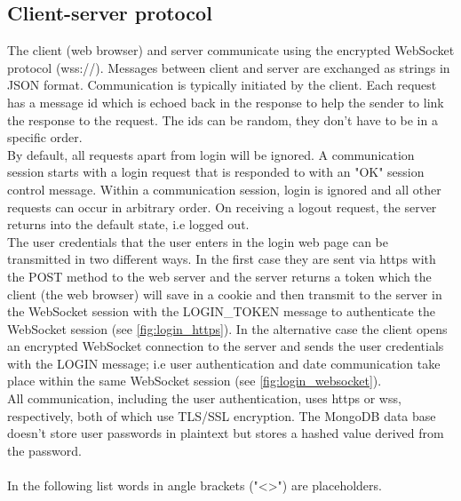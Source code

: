 \documentclass[oneside, english, final]{design}
\begin{document}
\clearpage


\subsection{Client-server protocol}
The client (web browser) and server communicate using the encrypted WebSocket protocol (wss://).
Messages between client and server are exchanged as strings in JSON format.
Communication is typically initiated by the client. Each request has a message id which is echoed back in the response to help the sender to link the response to the request. The ids can be random, they don't have to be in a specific order.
\\
By default, all requests apart from login will be ignored.  A communication session starts with a login request that is responded to with an "OK" session control message. Within a communication session, login is ignored and all other requests can occur in arbitrary order. On receiving a logout request, the server returns into the default state, i.e logged out.\\
The user credentials that the user enters in the login web page can be transmitted in two different ways.
In the first case they are sent via https with the POST method to the web server and the server returns a token which the client (the web browser) will save in a cookie and then transmit to the server in the WebSocket session with the LOGIN\_TOKEN message to authenticate the WebSocket session (see \autoref{fig:login_https}).
In the alternative case the client opens an encrypted WebSocket connection to the server and sends the user credentials with the LOGIN message; i.e user authentication and date communication take place within the same WebSocket session (see \autoref{fig:login_websocket}).\\
All communication, including the user authentication, uses https or wss, respectively, both of which use TLS/SSL encryption. The MongoDB data base doesn't store user passwords in plaintext but stores a hashed value derived from the password.\\
\hfill
\\
In the following list words in angle brackets ("<>") are placeholders.
\end{document}
